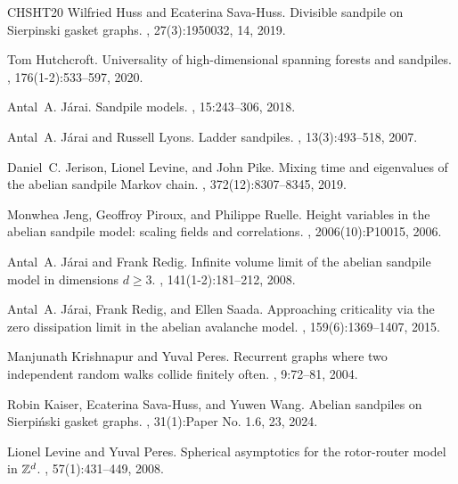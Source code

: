 \documentclass[11pt]{article}
\begin{document}
\begin{thebibliography}{CHSHT20}
Wilfried Huss and Ecaterina Sava-Huss.
\newblock Divisible sandpile on {S}ierpinski gasket graphs.
, 27(3):1950032, 14, 2019.

Tom Hutchcroft.
\newblock Universality of high-dimensional spanning forests and sandpiles.
, 176(1-2):533--597, 2020.

Antal~A. J\'arai.
\newblock Sandpile models.
, 15:243--306, 2018.

Antal~A. J\'arai and Russell Lyons.
\newblock Ladder sandpiles.
, 13(3):493--518, 2007.

Daniel~C. Jerison, Lionel Levine, and John Pike.
\newblock Mixing time and eigenvalues of the abelian sandpile {M}arkov chain.
, 372(12):8307--8345, 2019.

Monwhea Jeng, Geoffroy Piroux, and Philippe Ruelle.
\newblock Height variables in the abelian sandpile model: scaling fields and correlations.
, 2006(10):P10015, 2006.

Antal~A. J\'arai and Frank Redig.
\newblock Infinite volume limit of the abelian sandpile model in dimensions {$d\geq 3$}.
, 141(1-2):181--212, 2008.

Antal~A. J\'arai, Frank Redig, and Ellen Saada.
\newblock Approaching criticality via the zero dissipation limit in the abelian avalanche model.
, 159(6):1369--1407, 2015.

Manjunath Krishnapur and Yuval Peres.
\newblock Recurrent graphs where two independent random walks collide finitely often.
, 9:72--81, 2004.

Robin Kaiser, Ecaterina Sava-Huss, and Yuwen Wang.
\newblock Abelian sandpiles on {S}ierpi\'nski gasket graphs.
, 31(1):Paper No. 1.6, 23, 2024.

Lionel Levine and Yuval Peres.
\newblock Spherical asymptotics for the rotor-router model in {$\Bbb Z^d$}.
, 57(1):431--449, 2008.


\end{thebibliography}
\end{document}
